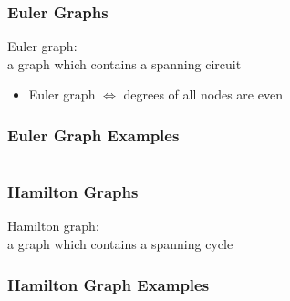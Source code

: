 \documentclass[dvipsnames]{beamer}
\begin{document}
\begin{frame}
  \frametitle{Euler Graphs}

  \begin{definition}
    \alert{Euler graph}:\\
      a graph which contains a spanning circuit

    \pause
    \begin{itemize}
      \item Euler graph $\Leftrightarrow$ degrees of all nodes are even
    \end{itemize}
  \end{definition}
\end{frame}

\begin{frame}
  \frametitle{Euler Graph Examples}

  \begin{columns}
    \begin{example}
      \begin{center}
      \end{center}
    \end{example}

    \begin{example}
      \begin{center}
      \end{center}
    \end{example}
  \end{columns}
\end{frame}

\begin{frame}
  \frametitle{Hamilton Graphs}

  \begin{definition}
    \alert{Hamilton graph}:\\
      a graph which contains a spanning cycle
  \end{definition}
\end{frame}

\begin{frame}
  \frametitle{Hamilton Graph Examples}

  \begin{columns}
    \begin{example}
      \begin{center}
      \end{center}
    \end{example}

    \begin{example}
      \begin{center}
      \end{center}
    \end{example}
  \end{columns}
\end{frame}
\end{document}
